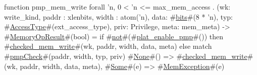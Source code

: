 function pmp_mem_write forall 'n, 0 < 'n <= max_mem_access . (wk: write_kind, paddr : xlenbits, width : atom('n), data: #\hyperref[sailRISCVzbits]{bits}#(8 * 'n), typ: #\hyperref[sailRISCVzAccessType]{AccessType}#(ext_access_type), priv: Privilege, meta: mem_meta) -> #\hyperref[sailRISCVzMemoryOpResult]{MemoryOpResult}#(bool) =
  if   #\hyperref[sailRISCVznot]{not}#(#\hyperref[sailRISCVzplatzyenablezypmp]{plat\_enable\_pmp}#())
  then #\hyperref[sailRISCVzcheckedzymemzywrite]{checked\_mem\_write}#(wk, paddr, width, data, meta)
  else {
    match #\hyperref[sailRISCVzpmpCheck]{pmpCheck}#(paddr, width, typ, priv) {
      #\hyperref[sailRISCVzNone]{None}#()  => #\hyperref[sailRISCVzcheckedzymemzywrite]{checked\_mem\_write}#(wk, paddr, width, data, meta),
      #\hyperref[sailRISCVzSome]{Some}#(e) => #\hyperref[sailRISCVzMemException]{MemException}#(e)
    }
  }

